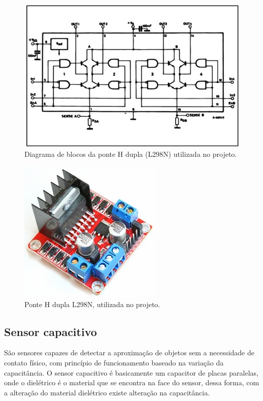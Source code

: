 \begin{figure}[!ht]
	\centering
		\includegraphics[scale=0.9]{figuras/eletronica/6-Diagrama-de-blocos-ponte-H.jpg}
	\caption{Diagrama de blocos da ponte H dupla (L298N) utilizada no projeto.}
\end{figure}

\begin{figure}[!ht]
	\centering
		\includegraphics[scale=0.5]{figuras/eletronica/7-Ponte-H-dupla.jpg}
	\caption{Ponte H dupla L298N, utilizada no projeto.}
\end{figure}

\subsection{Sensor capacitivo}
São sensores capazes de detectar a aproximação de objetos sem a necessidade de contato físico, com princípio de funcionamento baseado na variação da capacitância. O sensor capacitivo é basicamente um capacitor de placas paralelas, onde o dielétrico é o material que se encontra na face do sensor, dessa forma, com a alteração do material dielétrico existe alteração na capacitância.\cite{tecnicasSensoriamento}

